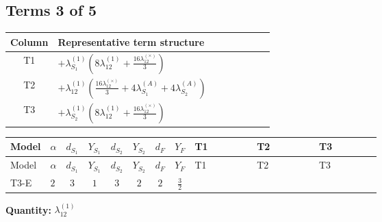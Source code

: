 \documentclass[8pt]{article}
\begin{document}
\begin{landscape}
\subsection*{Terms 3 of 5}
\begin{center}
\begin{tabular}{@{}c >{\raggedright\arraybackslash}p{0.82\linewidth}@{}}
\toprule
Column & Representative term structure \\
\midrule
T1 & \(\displaystyle +{\lambda_{S_1}^{(1)}} \left(8 {\lambda_{12}^{(1)}}+\frac{16 {\lambda_{12}^{(\times)}}}{3}\right)\) \\
\midrule
T2 & \(\displaystyle +{\lambda_{12}^{(1)}} \left(\frac{16 {\lambda_{12}^{(\times)}}}{3}+4 {\lambda_{S_1}^{(A)}}+4 {\lambda_{S_2}^{(A)}}\right)\) \\
\midrule
T3 & \(\displaystyle +{\lambda_{S_2}^{(1)}} \left(8 {\lambda_{12}^{(1)}}+\frac{16 {\lambda_{12}^{(\times)}}}{3}\right)\) \\
\midrule
\bottomrule
\end{tabular}
\end{center}
\smallskip
\tiny
\begin{longtable}{@{}llcccccc >{\raggedright\arraybackslash}p{0.21\linewidth} >{\raggedright\arraybackslash}p{0.21\linewidth} >{\raggedright\arraybackslash}p{0.21\linewidth}@{}}
\toprule
Model & $\alpha$ & $d_{S_1}$ & $Y_{S_1}$ & $d_{S_2}$ & $Y_{S_2}$ & $d_F$ & $Y_F$ & T1 & T2 & T3 \\
\midrule
\endfirsthead
\toprule
Model & $\alpha$ & $d_{S_1}$ & $Y_{S_1}$ & $d_{S_2}$ & $Y_{S_2}$ & $d_F$ & $Y_F$ & T1 & T2 & T3 \\
\midrule
\endhead
T3-E & $2$ & $3$ & $1$ & $3$ & $2$ & $2$ & $\frac{3}{2}$ & \scriptsize\adjustbox{max width=\linewidth}{$\begin{gathered} +{\lambda_{S_1}^{(1)}} \left(8 {\lambda_{12}^{(1)}}+\frac{16 {\lambda_{12}^{(\times)}}}{3}\right)\end{gathered}$} & \scriptsize\adjustbox{max width=\linewidth}{$\begin{gathered} +{\lambda_{12}^{(1)}} \left(\frac{16 {\lambda_{12}^{(\times)}}}{3}+4 {\lambda_{S_1}^{(A)}}+4 {\lambda_{S_2}^{(A)}}\right)\end{gathered}$} & \scriptsize\adjustbox{max width=\linewidth}{$\begin{gathered} +{\lambda_{S_2}^{(1)}} \left(8 {\lambda_{12}^{(1)}}+\frac{16 {\lambda_{12}^{(\times)}}}{3}\right)\end{gathered}$} \\
\midrule
\bottomrule
\end{longtable}
\clearpage
\noindent\textbf{Quantity: }$\lambda_{12}^{(1)}$\par\smallskip

\end{landscape}
\end{document}
